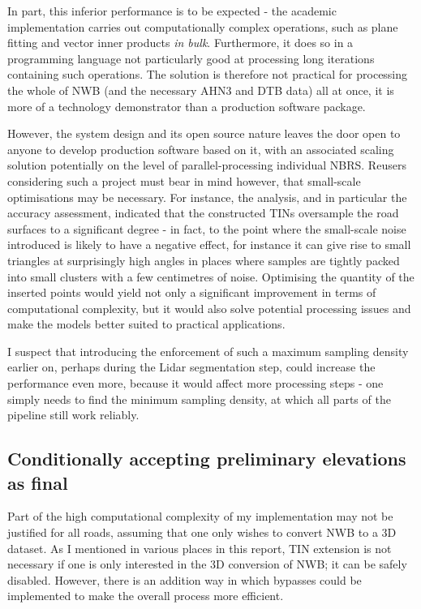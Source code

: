 In part, this inferior performance is to be expected - the academic implementation carries out computationally complex operations, such as plane fitting and vector inner products \textit{in bulk}. Furthermore, it does so in a programming language not particularly good at processing long iterations containing such operations. The solution is therefore not practical for processing the whole of NWB (and the necessary AHN3 and DTB data) all at once, it is more of a technology demonstrator than a production software package.

However, the system design and its open source nature leaves the door open to anyone to develop production software based on it, with an associated scaling solution potentially on the level of parallel-processing individual NBRS. Reusers considering such a project must bear in mind however, that small-scale optimisations may be necessary. For instance, the analysis, and in particular the accuracy assessment, indicated that the constructed TINs oversample the road surfaces to a significant degree - in fact, to the point where the small-scale noise introduced is likely to have a negative effect, for instance it can give rise to small triangles at surprisingly high angles in places where samples are tightly packed into small clusters with a few centimetres of noise. Optimising the quantity of the inserted points would yield not only a significant improvement in terms of computational complexity, but it would also solve potential processing issues and make the models better suited to practical applications.

I suspect that introducing the enforcement of such a maximum sampling density earlier on, perhaps during the Lidar segmentation step, could increase the performance even more, because it would affect more processing steps - one simply needs to find the minimum sampling density, at which all parts of the pipeline still work reliably.

\subsection{Conditionally accepting preliminary elevations as final}
\label{sub:preliminaryelevationsasfinal}

Part of the high computational complexity of my implementation may not be justified for all roads, assuming that one only wishes to convert NWB to a 3D dataset. As I mentioned in various places in this report, TIN extension is not necessary if one is only interested in the 3D conversion of NWB; it can be safely disabled. However, there is an addition way in which bypasses could be implemented to make the overall process more efficient.

